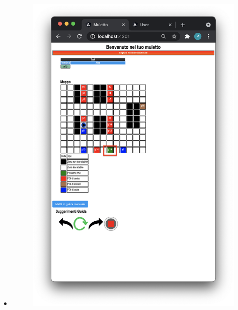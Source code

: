 \begin{itemize}
    \item \begin{figure}[H]
        \centering
        \includegraphics[scale=0.45]{res/images/next.png}
    \end{figure}
\end{itemize}
